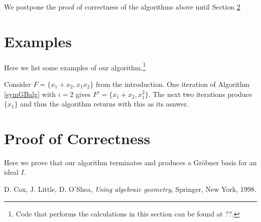 \documentclass{amsart}
\theoremstyle{definition}
\theoremstyle{remark}
\numberwithin{equation}{section}
\newcommand{\<}{\langle}
\renewcommand{\>}{\rangle}
\begin{document}
We postpone the proof of correctness of the algorithms above until Section \ref{proofcorrect}

\section{Examples}\label{algexamples}

Here we list some examples of our algorithm.\footnote{Code that performs the calculations in this section can be found at ??.}

Consider $F = \{x_1+x_2, x_1 x_2\}$ from the introduction.  One iteration of 
Algorithm \ref{symGBalg} with $i = 2$ gives $F' = \{x_1+x_2, x_1^2\}$.
The next two iterations produce $\{x_1\}$ and thus the algorithm returns with this 
as its asnwer. 

\section{Proof of Correctness}\label{proofcorrect}

Here we prove that our algorithm terminates and 
produces a Gr\"obner basis for an ideal $I$.




\begin{thebibliography}{99}




 D. Cox, J. Little, D. O'Shea, \emph{Using algebraic geometry},
Springer, New York, 1998.


%
%




\end{thebibliography}
\end{document}
